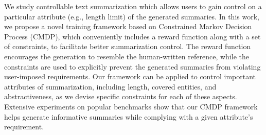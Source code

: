 We study controllable text summarization which allows users to gain control on a particular attribute (e.g., length limit) of the generated summaries. In this work, we propose a novel training framework based on Constrained Markov Decision Process (CMDP), which conveniently includes a reward function along with a set of constraints, to facilitate better summarization control. The reward function encourages the generation to resemble the human-written reference, while the constraints are used to explicitly prevent the generated summaries from violating user-imposed requirements. Our framework can be applied to control important attributes of summarization, including length, covered entities, and abstractiveness, as we devise specific constraints for each of these aspects. Extensive experiments on popular benchmarks show that our CMDP framework helps generate informative summaries while complying with a given attribute's requirement.